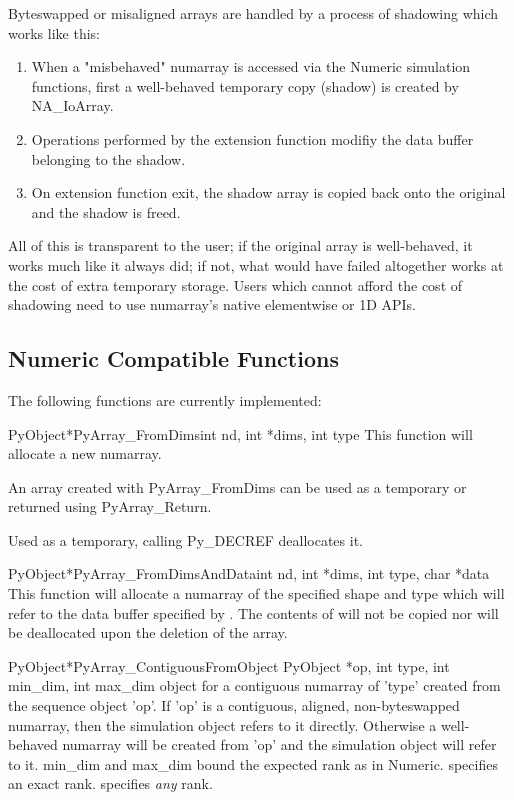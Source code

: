 Byteswapped or misaligned arrays are handled by a process of shadowing which
works like this:
\begin{enumerate}
\item When a "misbehaved" numarray is accessed via the Numeric simulation
  functions, first a well-behaved temporary copy (shadow) is created by
  NA_IoArray.
\item Operations performed by the extension function modifiy the data buffer
  belonging to the shadow.
\item On extension function exit, the shadow array is copied back onto the 
  original and the shadow is freed.
\end{enumerate}
All of this is transparent to the user; if the original array is well-behaved,
it works much like it always did; if not, what would have failed altogether
works at the cost of extra temporary storage.  Users which cannot afford the
cost of shadowing need to use numarray's native elementwise or 1D APIs.
\subsection{Numeric Compatible Functions}
\label{sec:C-API:compat:implemented-functions}

The following functions are currently implemented:
\begin{cfuncdesc}{PyObject*}{PyArray_FromDims}{int nd, int *dims, int type}
   This function will allocate a new numarray.

   An array created with PyArray_FromDims can be used as a temporary or
   returned using PyArray_Return.
   
   Used as a temporary, calling Py_DECREF deallocates it.   
\end{cfuncdesc}

\begin{cfuncdesc}{PyObject*}{PyArray_FromDimsAndData}{int nd, int *dims, int type, char *data}
   This function will allocate a numarray of the specified shape and type
   which will refer to the data buffer specified by .  The contents
   of  will not be copied nor will  be deallocated upon
   the deletion of the array.
\end{cfuncdesc}

\begin{cfuncdesc}{PyObject*}{PyArray_ContiguousFromObject}{%
      PyObject *op, int type, int min_dim, int max_dim}%
   object for a contiguous numarray of 'type' created from the sequence object
   'op'.  If 'op' is a contiguous, aligned, non-byteswapped numarray, then the
   simulation object refers to it directly.  Otherwise a well-behaved numarray
   will be created from 'op' and the simulation object will refer to it.
   min_dim and max_dim bound the expected rank as in Numeric.
    specifies an exact rank.  
   specifies \emph{any} rank.
\end{cfuncdesc}

